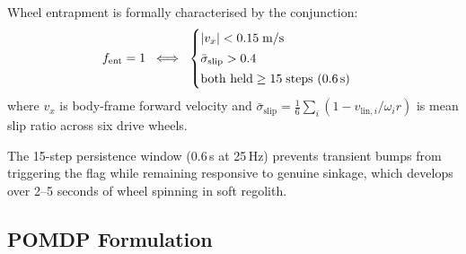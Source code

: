 \documentclass[conference]{IEEEtran}
\begin{document}
Wheel entrapment is formally characterised by the conjunction:
\begin{equation}
  f_{\text{ent}} = 1 \;\iff\;
  \begin{cases}
    |v_x| < 0.15\;\text{m/s}\\[2pt]
    \bar{\sigma}_{\text{slip}} > 0.4 \\[2pt]
    \text{both held} \geq 15\;\text{steps (0.6\,s)}
  \end{cases}
  \label{eq:entrapment}
\end{equation}
where $v_x$ is body-frame forward velocity and
$\bar{\sigma}_{\text{slip}} = \tfrac{1}{6}\sum_i(1 - v_{\text{lin},i}/\omega_i r)$
is mean slip ratio across six drive wheels.

The 15-step persistence window (0.6\,s at 25\,Hz) prevents transient bumps from
triggering the flag while remaining responsive to genuine sinkage, which develops
over 2--5 seconds of wheel spinning in soft regolith.

\subsection{POMDP Formulation}
\end{document}
